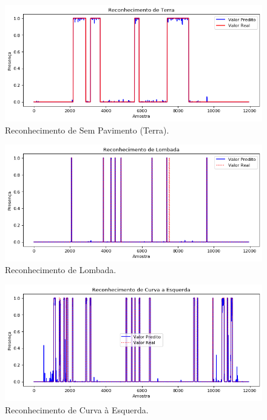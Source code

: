 \begin{figure}[h!]
  \centering
  \caption{Reconhecimento de Sem Pavimento (Terra).}
   \label{fig:resultado_terra}
   \includegraphics[width=1\textwidth]{figuras/fig4_2_3.png}
\end{figure}

\begin{figure}[h!]
  \centering
  \caption{Reconhecimento de Lombada.}
   \label{fig:resutlado_lombada}
   \includegraphics[width=1\textwidth]{figuras/fig4_2_4.png}
\end{figure}

\begin{figure}[h!]
  \centering
  \caption{Reconhecimento de Curva à Esquerda.}
   \label{fig:resultado_curva_esquerda}
   \includegraphics[width=1\textwidth]{figuras/fig4_2_5.png}
\end{figure}

